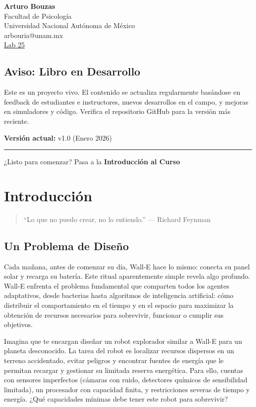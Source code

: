 \documentclass[
  letterpaper,
  DIV=11,
  numbers=noendperiod]{scrreprt}
\begin{document}
\textbf{Arturo Bouzas}\\
Facultad de Psicología\\
Universidad Nacional Autónoma de México\\
arbouria@unam.mx\\
\href{https://www.bouzaslab25.com}{Lab 25}

\section{Aviso: Libro en Desarrollo}\label{aviso-libro-en-desarrollo}

Este es un proyecto vivo. El contenido se actualiza regularmente
basándose en feedback de estudiantes e instructores, nuevos desarrollos
en el campo, y mejoras en simuladores y código. Verifica el repositorio
GitHub para la versión más reciente.

\textbf{Versión actual:} v1.0 (Enero 2026)

\begin{center}\rule{0.5\linewidth}{0.5pt}\end{center}

¿Listo para comenzar? Pasa a la \textbf{Introducción al Curso}


\chapter{Introducción}\label{introducciuxf3n}

\begin{quote}
``Lo que no puedo crear, no lo entiendo.'' --- Richard Feynman
\end{quote}

\section{Un Problema de Diseño}\label{un-problema-de-diseuxf1o}

Cada mañana, antes de comenzar su día, Wall-E hace lo mismo: conecta su
panel solar y recarga su batería. Este ritual aparentemente simple
revela algo profundo. Wall-E enfrenta el problema fundamental que
comparten todos los agentes adaptativos, desde bacterias hasta
algoritmos de inteligencia artificial: cómo distribuir el comportamiento
en el tiempo y en el espacio para maximizar la obtención de recursos
necesarios para sobrevivir, funcionar o cumplir sus objetivos.

Imagina que te encargan diseñar un robot explorador similar a Wall-E
para un planeta desconocido. La tarea del robot es localizar recursos
dispersos en un terreno accidentado, evitar peligros y encontrar fuentes
de energía que le permitan recargar y gestionar su limitada reserva
energética. Para ello, cuentas con sensores imperfectos (cámaras con
ruido, detectores químicos de sensibilidad limitada), un procesador con
capacidad finita, y restricciones severas de tiempo y energía. ¿Qué
capacidades mínimas debe tener este robot para sobrevivir?
\end{document}
